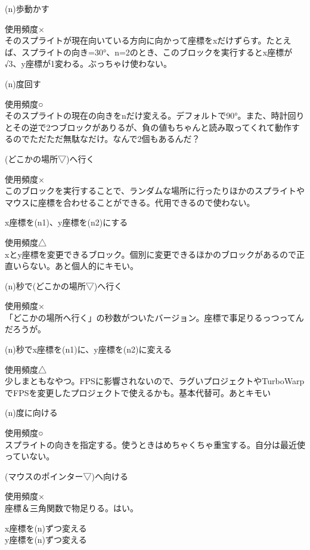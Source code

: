 \documentclass[b5paper,10pt]{jsarticle}
\begin{document}
\begin{multicols*}{3}
\begin{itembox}{1}
(n)歩動かす
\end{itembox}
使用頻度×\\
そのスプライトが現在向いている方向に向かって座標をxだけずらす。たとえば、スプライトの向き=30°、n=2のとき、このブロックを実行するとx座標が√3、y座標が1変わる。ぶっちゃけ使わない。
\begin{itembox}{2}
(n)度回す
\end{itembox}
使用頻度○\\
そのスプライトの現在の向きをnだけ変える。デフォルトで90°。また、時計回りとその逆で2つブロックがありるが、負の値もちゃんと読み取ってくれて動作するのでただただ無駄なだけ。なんで2個もあるんだ？
\begin{itembox}{3}
(どこかの場所▽)へ行く
\end{itembox}
使用頻度×\\
このブロックを実行することで、ランダムな場所に行ったりほかのスプライトやマウスに座標を合わせることができる。代用できるので使わない。
\begin{itembox}{4}
x座標を(n1)、y座標を(n2)にする
\end{itembox}
使用頻度△\\
xとy座標を変更できるブロック。個別に変更できるほかのブロックがあるので正直いらない。あと個人的にキモい。
\begin{itembox}{5}
(n)秒で(どこかの場所▽)へ行く
\end{itembox}
使用頻度×\\
「どこかの場所へ行く」の秒数がついたバージョン。座標で事足りるっつってんだろうが。
\begin{itembox}{6}
(n)秒でx座標を(n1)に、y座標を(n2)に変える
\end{itembox}
使用頻度△\\
少しまともなやつ。FPSに影響されないので、ラグいプロジェクトやTurboWarpでFPSを変更したプロジェクトで使えるかも。基本代替可。あとキモい
\begin{itembox}{7}
(n)度に向ける
\end{itembox}
使用頻度○\\
スプライトの向きを指定する。使うときはめちゃくちゃ重宝する。自分は最近使っていない。
\begin{itembox}{8}
(マウスのポインター▽)へ向ける
\end{itembox}
使用頻度×\\
座標＆三角関数で物足りる。はい。
\begin{itembox}{9}
x座標を(n)ずつ変える\\y座標を(n)ずつ変える
\end{itembox}

\end{multicols*}
\end{document}

